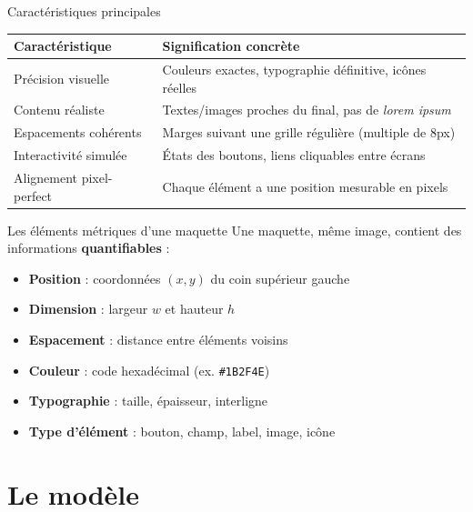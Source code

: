 \documentclass[11pt,aspectratio=169]{beamer}
\begin{document}
\begin{frame}{Caractéristiques principales}
\small
\begin{tabularx}{\textwidth}{@{}lX@{}}
\toprule
\textbf{Caractéristique} & \textbf{Signification concrète} \\
\midrule
Précision visuelle & Couleurs exactes, typographie définitive, icônes réelles \\
Contenu réaliste & Textes/images proches du final, pas de \emph{lorem ipsum} \\
Espacements cohérents & Marges suivant une grille régulière (multiple de 8px) \\
Interactivité simulée & États des boutons, liens cliquables entre écrans \\
Alignement pixel-perfect & Chaque élément a une position mesurable en pixels \\
\bottomrule
\end{tabularx}
\end{frame}

\begin{frame}{Les éléments métriques d'une maquette}
Une maquette, même image, contient des informations \textbf{quantifiables} :
\begin{itemize}
    \item \textbf{Position} : coordonnées $(x,y)$ du coin supérieur gauche
    \item \textbf{Dimension} : largeur $w$ et hauteur $h$
    \item \textbf{Espacement} : distance entre éléments voisins
    \item \textbf{Couleur} : code hexadécimal (ex. \texttt{\#1B2F4E})
    \item \textbf{Typographie} : taille, épaisseur, interligne
    \item \textbf{Type d'élément} : bouton, champ, label, image, icône
\end{itemize}
\end{frame}


\section{Le modèle}
\end{document}
